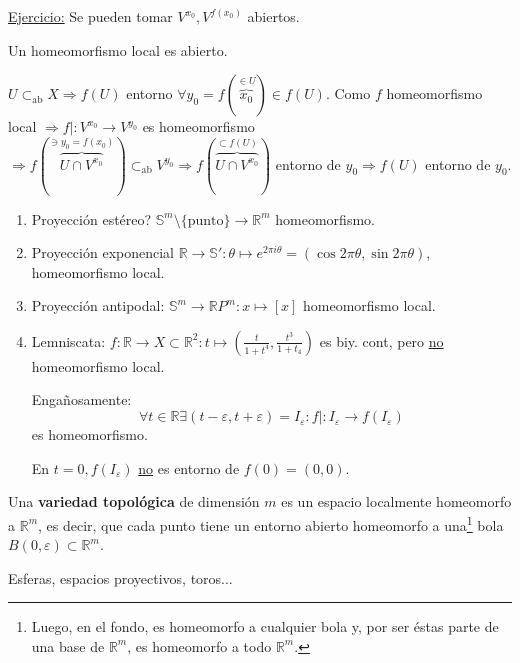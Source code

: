 \underline{Ejercicio:} Se pueden tomar $V^{x_0}, V^{f\left( x_0 \right)}$ abiertos.

\begin{obs}
Un homeomorfismo local es abierto.
\end{obs}
\begin{demo}
    $U \subset_{\text{ab}} X \Rightarrow f\left( U \right)$ entorno $\forall y_0 = f\left(\overbrace{x_0}^{\in U}\right) \in f\left( U \right)$.
    Como $f$ homeomorfismo local $\Rightarrow f| : V^{x_0} \rightarrow V^{y_0}$ es homeomorfismo $\Rightarrow f\left( \overbrace{U \cap V^{x_0}}^{\ni y_0 = f\left( x_0 \right)} \right) \subset_{\text{ab}} V^{y_0} \Rightarrow f\left( \overbrace{U \cap V^{x_0}}^{\subset f\left( U \right)} \right)$ entorno de $y_0 \Rightarrow f\left( U \right)$ entorno de $y_0$.
\end{demo}

\begin{ej}[¡Importantes!]
\begin{enumerate}
    \item Proyección estéreo? $\mathbb{S}^{m} \setminus \{\text{punto}\} \rightarrow \mathbb{R}^m$ homeomorfismo.
    \item Proyección exponencial $\mathbb{R} \rightarrow \mathbb{S}': \theta \mapsto e^{2\pi i\theta} = \left( \cos 2\pi \theta, \sin 2\pi \theta \right)$, homeomorfismo local.
    \item Proyección antipodal: $\mathbb{S}^m \rightarrow \mathbb{R}P^{m}: x \mapsto \left[ x \right]$ homeomorfismo local.
    \item Lemniscata: $f: \mathbb{R} \rightarrow X \subset \mathbb{R}^2: t \mapsto \left( \frac{t}{1 + t^4}, \frac{t^3}{1 + t_4} \right)$ es biy. cont, pero \underline{no} homeomorfismo local.

    Engañosamente: 
    \[
        \forall t \in \mathbb{R} \exists \left( t - \varepsilon, t + \varepsilon \right) = I_{\varepsilon}: f| : I_{\varepsilon} \rightarrow f\left( I_{\varepsilon} \right) 
    \]
    es homeomorfismo.

    En $t = 0, f\left( I_{\varepsilon} \right)$ \underline{no} es entorno de $f\left( 0 \right) = \left( 0, 0 \right)$.
\end{enumerate} 
\end{ej}

\begin{defi}
Una \textbf{variedad topológica} de dimensión $m$ es un espacio localmente homeomorfo a $\mathbb{R}^m$, es decir, que cada punto tiene un entorno abierto homeomorfo a una\footnote{Luego, en el fondo, es homeomorfo a cualquier bola y, por ser éstas parte de una base de $\mathbb{R}^m$, es homeomorfo a todo $\mathbb{R}^m$.} bola $B\left( 0, \varepsilon \right) \subset \mathbb{R}^m$.
\end{defi}
\begin{ej}
Esferas, espacios proyectivos, toros...
\end{ej}

